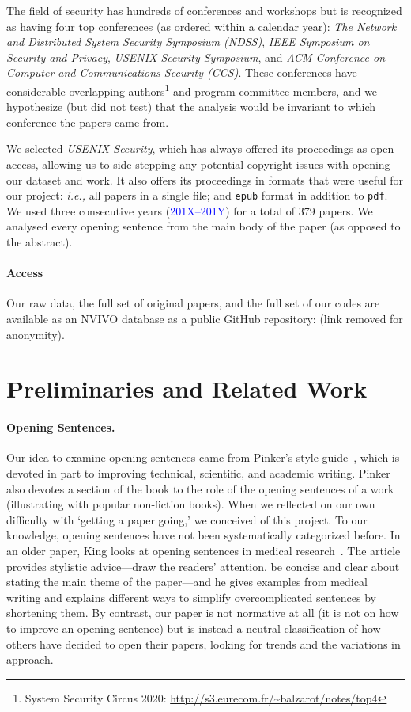 \documentclass[sigconf,anonymous]{acmart}
\newcommand{\ie}{\textit{i.e.,}\xspace}
\newcommand{\textblue}[1]{\textcolor{blue}{#1}}
\begin{document}
The field of security has hundreds of conferences and workshops but is recognized as having four top conferences (as ordered within a calendar year): \textit{The Network and Distributed System Security Symposium (NDSS)}, \textit{IEEE Symposium on Security and Privacy}, \textit{USENIX Security Symposium}, and \textit{ACM Conference on Computer and Communications Security (CCS)}. These conferences have considerable overlapping authors\footnote{System Security Circus 2020: \url{http://s3.eurecom.fr/~balzarot/notes/top4}} and program committee members, and we hypothesize (but did not test) that the analysis would be invariant to which conference the papers came from.

We selected \textit{USENIX Security}, which has always offered its proceedings as open access, allowing us to side-stepping any potential copyright issues with opening our dataset and work. It also offers its proceedings in formats that were useful for our project: \ie all papers in a single file; and \texttt{epub} format in addition to \texttt{pdf}. We used three consecutive years (\textblue{201X--201Y}) for a total of 379 papers. We analysed every opening sentence from the main body of the paper (as opposed to the abstract).
	
\paragraph{Access} Our raw data, the full set of original papers, and the full set of our codes are available as an NVIVO database as a public GitHub repository: (link removed for anonymity). 
	
	
\section{Preliminaries and Related Work}
	
\paragraph{Opening Sentences.}

Our idea to examine opening sentences came from Pinker's style guide~\cite{Pin15}, which is devoted in part to improving technical, scientific, and academic writing. Pinker also devotes a section of the book to the role of the opening sentences of a work (illustrating with popular non-fiction books). When we reflected on our own difficulty with `getting a paper going,' we conceived of this project. To our knowledge, opening sentences have not been systematically categorized before. In an older paper, King looks at opening sentences in medical research~\cite{king1967opening}. The article provides stylistic advice---draw the readers' attention, be concise and clear about stating the main theme of the paper---and he gives examples from medical writing and explains different ways to simplify overcomplicated sentences by shortening them. By contrast, our paper is not normative at all (it is not on how to improve an opening sentence) but is instead a neutral classification of how others have decided to open their papers, looking for trends and the variations in approach. 
\end{document}
